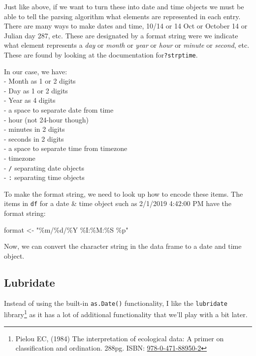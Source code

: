 \documentclass[
  letterpaper,
]{book}
\newenvironment{Shaded}{\begin{snugshade}}{\end{snugshade}}
\newcommand{\NormalTok}[1]{\textcolor[rgb]{0.00,0.23,0.31}{#1}}
\newcommand{\OtherTok}[1]{\textcolor[rgb]{0.00,0.23,0.31}{#1}}
\newcommand{\StringTok}[1]{\textcolor[rgb]{0.13,0.47,0.30}{#1}}
\begin{document}
Just like above, if we want to turn these into date and time objects we
must be able to tell the parsing algorithm what elements are represented
in each entry. There are many ways to make dates and time, 10/14 or 14
Oct or October 14 or Julian day 287, etc. These are designated by a
format string were we indicate what element represents a \emph{day} or
\emph{month} or \emph{year} or \emph{hour} or \emph{minute} or
\emph{second}, etc. These are found by looking at the documentation
for\texttt{?strptime}.

In our case, we have:\\
- Month as 1 or 2 digits\\
- Day as 1 or 2 digits\\
- Year as 4 digits\\
- a space to separate date from time\\
- hour (not 24-hour though)\\
- minutes in 2 digits\\
- seconds in 2 digits\\
- a space to separate time from timezone\\
- timezone\\
- \texttt{/} separating date objects\\
- \texttt{:} separating time objects

To make the format string, we need to look up how to encode these items.
The items in \texttt{df} for a date \& time object such as 2/1/2019
4:42:00 PM have the format string:

\begin{Shaded}
\begin{Highlighting}[]
\NormalTok{format }\OtherTok{\textless{}{-}} \StringTok{"\%m/\%d/\%Y \%I:\%M:\%S \%p"}
\end{Highlighting}
\end{Shaded}

Now, we can convert the character string in the data frame to a date and
time object.

\subsection{Lubridate}\label{lubridate}

Instead of using the built-in \texttt{as.Date()} functionality, I like
the \texttt{lubridate} library\footnote{Pielou EC, (1984) The
  interpretation of ecological data: A primer on classification and
  ordination. 288pg. ISBN:
  \href{https://www.wiley.com/en-us/The+Interpretation+of+Ecological+Data\%3A+A+Primer+on+Classification+and+Ordination-p-9780471889502}{978-0-471-88950-2}}
as it has a lot of additional functionality that we'll play with a bit
later.
\end{document}
